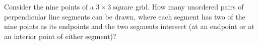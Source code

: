 Consider the nine points of a $3\times3$ square grid. How many unordered pairs of perpendicular line segments can be drawn, where each segment has two of the nine points as its endpoints and the two segments intersect (at an endpoint or at an interior point of either segment)?
